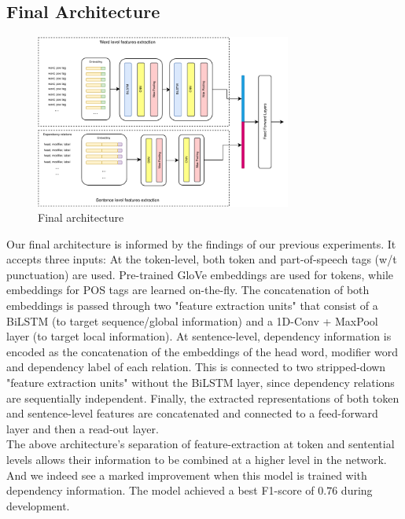 \documentclass[11pt]{article}
\begin{document}
\subsection{Final Architecture}

\begin{figure}[]
	\centering
	\includegraphics[width=0.75\textwidth]{model_arch.pdf}
	\caption{Final architecture}
	\label{fig:final_model}
\end{figure}

Our final architecture is informed by the findings of our previous experiments. It accepts three inputs: At the token-level, both  token
and part-of-speech tags (w/t punctuation) are used. Pre-trained GloVe embeddings are used for tokens, while embeddings for POS tags
are learned on-the-fly. The concatenation of both embeddings is passed through two "feature extraction units" that consist of a
BiLSTM (to target sequence/global information) and a 1D-Conv + MaxPool layer (to target local information). At sentence-level,
dependency information is encoded as the concatenation of the embeddings of the head word, modifier word and dependency label of each relation.
This is connected to two stripped-down "feature extraction units" without the BiLSTM layer, since dependency relations are
sequentially independent. Finally, the extracted representations of both token and sentence-level features are concatenated and
connected to a feed-forward layer and then a read-out layer.\\

The above architecture's separation of feature-extraction at token and sentential levels allows their information to be combined
at a higher level in the network. And we indeed see a marked improvement when this model is trained with dependency information.
The model achieved a best F1-score of $0.76$ during development.
\end{document}
